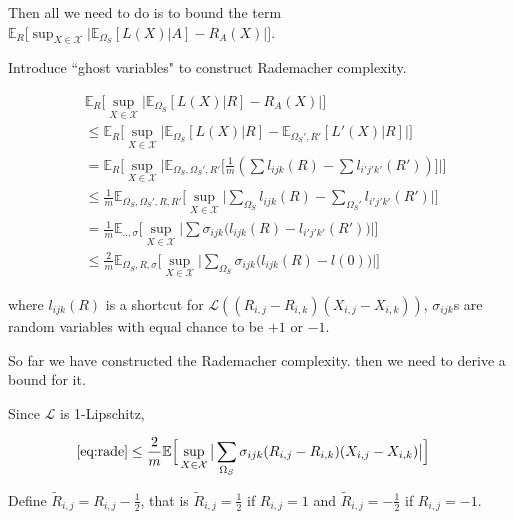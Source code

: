 \documentclass{article}
\numberwithin{equation}{section}
\newcommand{\supX}{\sup_{X \in \mathcal{X}}}
\newcommand{\E}{\mathbb{E}}
\newtheorem{sampling strategy}{Sampling Strategy}
\begin{document}
Then all we need to do is to bound the term $\mathbb{E}_R \Big[ \sup_{X \in \mathcal{X}} \big|\mathbb{E}_{\Omega_S} [L(X) | A] - R_A(X) \big| \Big]$.

Introduce ``ghost variables" to construct Rademacher complexity. \cite{uml}

\begin{subequations}
\begin{align}
    & \mathbb{E}_R \Big[ \sup_{X \in \mathcal{X}} \big|\mathbb{E}_{\Omega_S} [L(X) | R] - R_A(X) \big| \Big] \\
    & \leq \E_R  \Big[ \sup_{X \in \mathcal{X}} \big|\mathbb{E}_{\Omega_S} [L(X) | R] - \E_{\Omega_S', R'} [L'(X) | R] \big| \Big] \nonumber \\
    & = \E_R \Big[ \supX \big| \E_{\Omega_S, \Omega_S', R'} \big[ \frac{1}{m}( \sum l_{ijk}(R) - \sum l_{i'j'k'}(R') ) \big] \big| \Big] \nonumber \\
    & \leq \frac{1}{m} \E_{\Omega_S, \Omega_S', R, R'} \Big[ \supX \big| \sum_{ \Omega_S} l_{ijk}(R) - \sum_{ \Omega_S'} l_{i'j'k'}(R')  \big| \Big] \nonumber \\
    & = \frac{1}{m} \E_{.., \sigma} \Big[ \supX \big| \sum \sigma_{ijk} \big( l_{ijk}(R) - l_{i'j'k'}(R') \big) \big| \Big] \nonumber \\
    & \leq \frac{2}{m} \E_{\Omega_S, R, \sigma} \Big[ \supX \big| \sum_{\Omega_S} \sigma_{ijk} \big( l_{ijk}(R) - l(0) \big)  \big| \Big]  \label{eq:rade} 
\end{align}
\end{subequations}

where $l_{ijk}(R)$ is a shortcut for $\mathcal{L}((R_{i,j} - R_{i,k})(X_{i,j} - X_{i,k}))$, $\sigma_{ijk}$s are random variables with equal chance to be $+1$ or $-1$. 

So far we have constructed the Rademacher complexity. then we need to derive a bound for it.

Since $\mathcal{L}$ is 1-Lipschitz,

\begin{subequations}
\begin{align}
    \ref{eq:rade} & \leq \frac{2}{m} \E \Big[ \supX \big| \sum_{\Omega_S} \sigma_{ijk} (R_{i,j} - R_{i,k})(X_{i,j} - X_{i,k}) \big| \Big] \label{eq:lip}
\end{align}
\end{subequations}

Define $\tilde{R}_{i,j} = R_{i,j} - \frac{1}{2}$, that is $\tilde{R}_{i,j} = \frac{1}{2}$ if $R_{i,j} = 1$ and $\tilde{R}_{i,j} = -\frac{1}{2}$ if $R_{i,j} = -1$.
\end{document}
